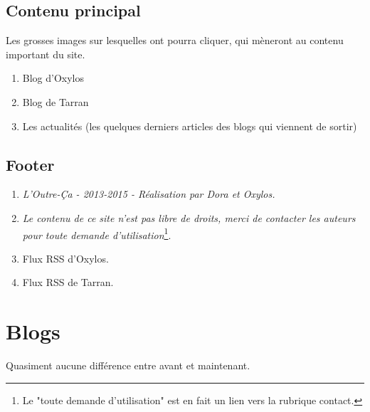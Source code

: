 \documentclass[french]{report}
\theoremstyle{plain}
\begin{document}
		\section{Contenu principal}
			Les grosses images sur lesquelles ont pourra cliquer, qui mèneront au contenu important du site.
			\begin{enumerate}
				\item Blog d'Oxylos
				\item Blog de Tarran
				\item Les actualités (les quelques derniers articles des blogs qui viennent de sortir) 
			\end{enumerate}


		\section{Footer}
			\begin{enumerate}
				\item \emph{L'Outre-Ça - 2013-2015 - Réalisation par Dora et Oxylos.}
				\item \emph{Le contenu de ce site n'est pas libre de droits, merci de contacter les auteurs pour toute demande d'utilisation}\footnote{Le "toute demande d'utilisation" est en fait un lien vers la rubrique contact.}.
				\item Flux RSS d'Oxylos.
				\item Flux RSS de Tarran. 
			\end{enumerate}


\chapter{Blogs}
	Quasiment aucune différence entre avant et maintenant. 
\end{document}
